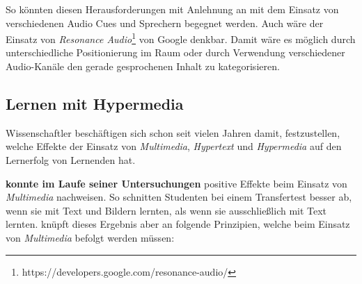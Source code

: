 So könnten diesen Herausforderungen mit Anlehnung an \cite{donker2007gestaltung} mit dem Einsatz von verschiedenen Audio Cues und Sprechern begegnet werden. Auch wäre der Einsatz von \textit{Resonance Audio}\footnote{https://developers.google.com/resonance-audio/} von Google denkbar. Damit wäre es möglich durch unterschiedliche Positionierung im Raum oder durch Verwendung verschiedener Audio-Kanäle den gerade gesprochenen Inhalt zu kategorisieren. 

\subsection{Lernen mit Hypermedia}
Wissenschaftler beschäftigen sich schon seit vielen Jahren damit, festzustellen, welche Effekte der Einsatz von \textit{Multimedia}, \textit{Hypertext} und \textit{Hypermedia} auf den Lernerfolg von Lernenden hat.


\cite{mayer2009multimedia} \textbf{konnte im Laufe seiner Untersuchungen }positive Effekte beim Einsatz von \textit{Multimedia} nachweisen. So schnitten Studenten bei einem Transfertest besser ab, wenn sie mit Text und Bildern lernten, als wenn sie ausschließlich mit Text lernten. \cite{mayer2009multimedia} knüpft dieses Ergebnis aber an folgende Prinzipien, welche beim Einsatz von \textit{Multimedia} befolgt werden müssen:

